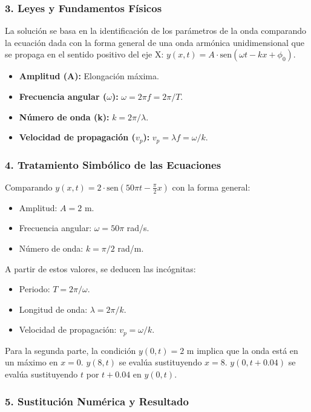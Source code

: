 \subsubsection*{3. Leyes y Fundamentos Físicos}
La solución se basa en la identificación de los parámetros de la onda comparando la ecuación dada con la forma general de una onda armónica unidimensional que se propaga en el sentido positivo del eje X: $y(x,t) = A \cdot \text{sen}(\omega t - kx + \phi_0)$.
\begin{itemize}
    \item \textbf{Amplitud (A):} Elongación máxima.
    \item \textbf{Frecuencia angular ($\omega$):} $\omega = 2\pi f = 2\pi/T$.
    \item \textbf{Número de onda (k):} $k = 2\pi/\lambda$.
    \item \textbf{Velocidad de propagación ($v_p$):} $v_p = \lambda f = \omega/k$.
\end{itemize}

\subsubsection*{4. Tratamiento Simbólico de las Ecuaciones}
Comparando $y(x,t)=2\cdot\text{sen}(50\pi t - \frac{\pi}{2}x)$ con la forma general:
\begin{itemize}
    \item Amplitud: $A = 2$ m.
    \item Frecuencia angular: $\omega = 50\pi$ rad/s.
    \item Número de onda: $k = \pi/2$ rad/m.
\end{itemize}
A partir de estos valores, se deducen las incógnitas:
\begin{itemize}
    \item Periodo: $T = 2\pi / \omega$.
    \item Longitud de onda: $\lambda = 2\pi / k$.
    \item Velocidad de propagación: $v_p = \omega/k$.
\end{itemize}
Para la segunda parte, la condición $y(0,t)=2$ m implica que la onda está en un máximo en $x=0$.
$y(8,t)$ se evalúa sustituyendo $x=8$.
$y(0, t+0.04)$ se evalúa sustituyendo $t$ por $t+0.04$ en $y(0,t)$.

\subsubsection*{5. Sustitución Numérica y Resultado}

